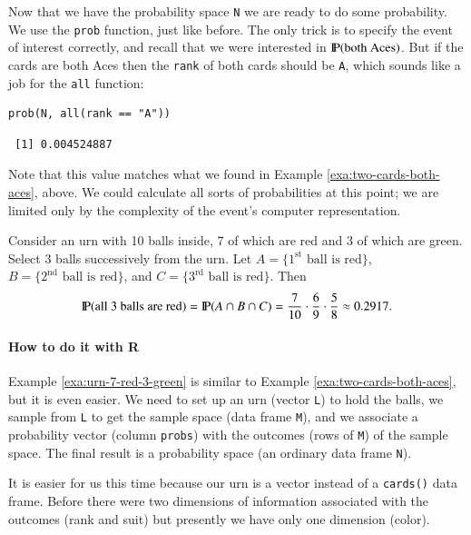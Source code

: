 \documentclass[captions=tableheading]{scrbook}
\begin{document}
Now that we have the probability space \texttt{N} we are ready to do some probability. We use the \texttt{prob} function, just like before. The only trick is to specify the event of interest correctly, and recall that we were interested in \(\P(\mbox{both Aces})\). But if the cards are both Aces then the \texttt{rank} of both cards should be \texttt{A}, which sounds like a job for the \texttt{all} function:


\begin{verbatim}
prob(N, all(rank == "A"))
\end{verbatim}

\begin{verbatim}
 [1] 0.004524887
\end{verbatim}

Note that this value matches what we found in Example \ref{exa:two-cards-both-aces}, above. We could calculate all sorts of probabilities at this point; we are limited only by the complexity of the event's computer representation. 


\begin{example}
\label{exa:urn-7-red-3-green}
Consider an urn with 10 balls inside, 7 of which are red and 3 of which are green. Select 3 balls successively from the urn. Let \( A = \{ 1^{\mathrm{st}} \mbox{ ball is red} \} \), \( B = \{ 2^{\mathrm{nd}} \mbox{ ball is red} \} \), and \( C = \{ 3^{\mathrm{rd}} \mbox{ ball is red} \} \). Then
\[
\P(\mbox{all 3 balls are red})=\P(A\cap B\cap C)=\frac{7}{10}\cdot\frac{6}{9}\cdot\frac{5}{8}\approx 0.2917.
\]

\end{example}

\paragraph*{How to do it with \textsf{R}}

Example \ref{exa:urn-7-red-3-green} is similar to Example \ref{exa:two-cards-both-aces}, but it is even easier. We need to set up an urn (vector \texttt{L}) to hold the balls, we sample from \texttt{L} to get the sample space (data frame \texttt{M}), and we associate a probability vector (column \texttt{probs}) with the outcomes (rows of \texttt{M}) of the sample space. The final result is a probability space (an ordinary data frame \texttt{N}).

It is easier for us this time because our urn is a vector instead of a \texttt{cards()} data frame. Before there were two dimensions of information associated with the outcomes (rank and suit) but presently we have only one dimension (color).
\end{document}
